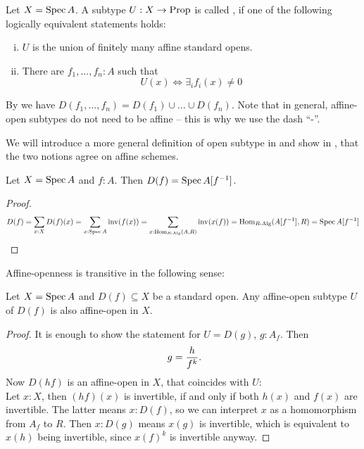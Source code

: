 \begin{definition}%
  \label{affine-open}
  Let $X=\operatorname{Spec} A$.
  A subtype $U:X\to\mathrm{Prop}$ is called ,
  if one of the following logically equivalent statements holds:
  \begin{enumerate}[(i)]%
  \item $U$ is the union of finitely many affine standard opens.
  \item There are $f_1,\dots,f_n:A$ such that
    \[U(x) \Leftrightarrow \exists_{i} f_i(x)\neq 0 \]
  \end{enumerate}
\end{definition}

By  we have $D(f_1, \dots, f_n) = D(f_1) \cup \dots \cup D(f_n)$.
Note that in general, affine-open subtypes do not need to be affine
-- this is why we use the dash ``-''.

We will introduce a more general definition of open subtype in 
and show in , that the two notions agree on affine schemes.

\begin{proposition}
  Let $X = \operatorname{Spec} A$ and $f : A$.
  Then $D(f) = \operatorname{Spec} A[f^{-1}]$.
\end{proposition}

\begin{proof}
  \[ D(f) =
     \sum_{x : X} D(f)(x) =
     \sum_{x : \operatorname{Spec} A} \mathrm{inv}(f(x)) =
     \sum_{x : \mathrm{Hom}_{R\text{-}\mathrm{Alg}}(A, R)} \mathrm{inv}(x(f)) =
     \mathrm{Hom}_{R\text{-}\mathrm{Alg}}(A[f^{-1}], R) =
     \operatorname{Spec} A[f^{-1}]
     \]
\end{proof}

Affine-openness is transitive in the following sense:

\begin{lemma}%
  \label{affine-open-trans}
  Let $X=\operatorname{Spec} A$ and $D(f)\subseteq X$ be a standard open.
  Any affine-open subtype $U$ of $D(f)$ is also affine-open in $X$.
\end{lemma}

\begin{proof}
  It is enough to show the statement for $U=D(g)$, $g:A_f$.
  Then
  \[ g=\frac{h}{f^k}\rlap{.}\]
  Now $D(hf)$ is an affine-open in $X$,
  that coincides with $U$: \\
  Let $x:X$, then $(hf)(x)$ is invertible, if and only if both $h(x)$ and $f(x)$ are invertible.
  The latter means $x:D(f)$, so we can interpret $x$ as a homomorphism from $A_f$ to $R$.
  Then $x:D(g)$ means $x(g)$ is invertible, which is equivalent to $x(h)$ being invertible,
  since $x(f)^k$ is invertible anyway.
\end{proof}

